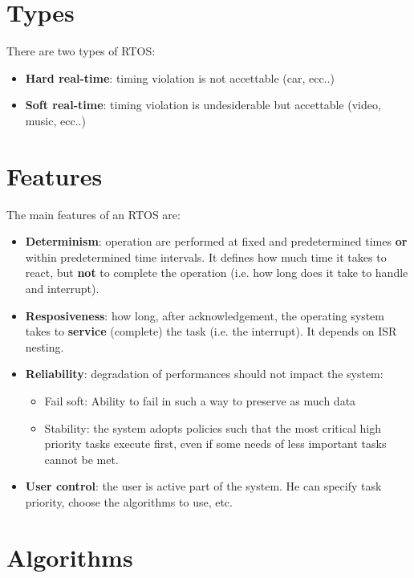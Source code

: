 \section{Types}
There are two types of RTOS:
\begin{itemize}
	\item \textbf{Hard real-time}: timing violation is not accettable (car, ecc..)
	\item \textbf{Soft real-time}: timing violation is undesiderable but accettable (video, music, ecc..)
\end{itemize}

\section{Features}
The main features of an RTOS are:
\begin{itemize}
	\item \textbf{Determinism}: operation are performed at fixed and predetermined times \textbf{or} within predetermined time intervals. It defines how much time it takes to react, but \textbf{not} to complete the operation (i.e. how long does it take to handle and interrupt).
	\item \textbf{Resposiveness}: how long, after acknowledgement, the operating system takes to \textbf{service} (complete) the task (i.e. the interrupt). It depends on ISR nesting.
	\item \textbf{Reliability}: degradation of performances should not impact the system:	
	\begin{itemize}
		\item Fail soft: Ability to fail in such a way to preserve as much data
		\item Stability: the system adopts policies such that the most critical high priority tasks execute first, even if some needs of less important tasks cannot be met.
	\end{itemize}
	\item \textbf{User control}: the user is active part of the system. He can specify task priority, choose the algorithms to use, etc.
\end{itemize}




\section{Algorithms}
%	
%	
	

